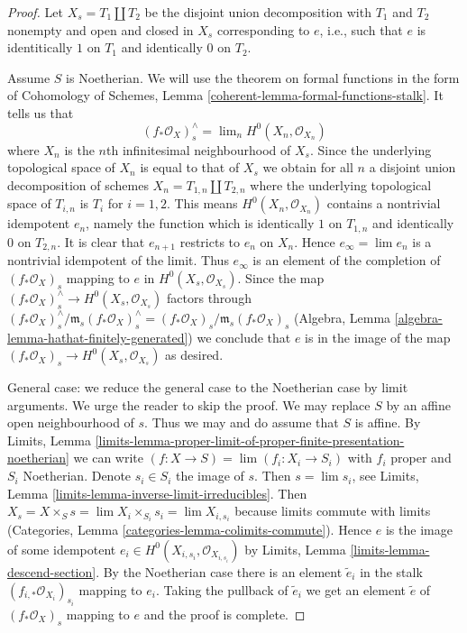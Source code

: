 \documentclass{stacks-project}
\theoremstyle{plain}
\theoremstyle{definition}
\theoremstyle{remark}
\numberwithin{equation}{subsection}
\def\lim{\mathop{\mathrm{lim}}\nolimits}
\begin{document}
\begin{proof}
Let $X_s = T_1 \amalg T_2$ be the disjoint union decomposition
with $T_1$ and $T_2$ nonempty and open and closed in $X_s$
corresponding to $e$, i.e., such that $e$ is identitically $1$
on $T_1$ and identically $0$ on $T_2$.

\medskip\noindent
Assume $S$ is Noetherian. We will use the theorem on formal functions
in the form of Cohomology of Schemes, Lemma
\ref{coherent-lemma-formal-functions-stalk}.
It tells us that
$$
(f_*\mathcal{O}_X)_s^\wedge = \lim_n H^0(X_n, \mathcal{O}_{X_n})
$$
where $X_n$ is the $n$th infinitesimal neighbourhood of $X_s$.
Since the underlying topological space of $X_n$ is equal to that
of $X_s$ we obtain for all $n $ a disjoint union decomposition of schemes
$X_n = T_{1, n} \amalg T_{2, n}$ where the underlying topological space
of $T_{i, n}$ is $T_i$ for $i = 1, 2$. This means
$H^0(X_n, \mathcal{O}_{X_n})$ contains a nontrivial idempotent $e_n$,
namely the function which is identically $1$ on $T_{1, n}$ and
identically $0$ on $T_{2, n}$. It is clear that $e_{n + 1}$
restricts to $e_n$ on $X_n$. Hence $e_\infty = \lim e_n$
is a nontrivial idempotent of the limit. Thus $e_\infty$
is an element of the completion of $(f_*\mathcal{O}_X)_s$
mapping to $e$ in $H^0(X_s, \mathcal{O}_{X_s})$.
Since the map $(f_*\mathcal{O}_X)_s^\wedge \to H^0(X_s, \mathcal{O}_{X_s})$
factors through
$(f_*\mathcal{O}_X)^\wedge_s / \mathfrak m_s (f_*\mathcal{O}_X)_s^\wedge =
(f_*\mathcal{O}_X)_s / \mathfrak m_s (f_*\mathcal{O}_X)_s$
(Algebra, Lemma \ref{algebra-lemma-hathat-finitely-generated})
we conclude that $e$ is in the image of the
map $(f_*\mathcal{O}_X)_s \to H^0(X_s, \mathcal{O}_{X_s})$
as desired.

\medskip\noindent
General case: we reduce the general case to the Noetherian case by
limit arguments. We urge the reader to skip the proof.
We may replace $S$ by an affine open neighbourhood of $s$.
Thus we may and do assume that $S$ is affine. By Limits, Lemma
\ref{limits-lemma-proper-limit-of-proper-finite-presentation-noetherian}
we can write $(f : X \to S) = \lim (f_i : X_i \to S_i)$ with $f_i$
proper and $S_i$ Noetherian. Denote $s_i \in S_i$ the image of $s$.
Then $s = \lim s_i$, see
Limits, Lemma \ref{limits-lemma-inverse-limit-irreducibles}.
Then $X_s = X \times_S s = \lim X_i \times_{S_i} s_i = \lim X_{i, s_i}$
because limits commute with limits
(Categories, Lemma \ref{categories-lemma-colimits-commute}).
Hence $e$ is the image of some idempotent
$e_i \in H^0(X_{i, s_i}, \mathcal{O}_{X_{i, s_i}})$
by Limits, Lemma \ref{limits-lemma-descend-section}.
By the Noetherian case there is an element $\tilde e_i$
in the stalk $(f_{i, *}\mathcal{O}_{X_i})_{s_i}$ mapping
to $e_i$. Taking the pullback of $\tilde e_i$ we get an
element $\tilde e$ of $(f_*\mathcal{O}_X)_s$ mapping
to $e$ and the proof is complete.
\end{proof}
\end{document}
